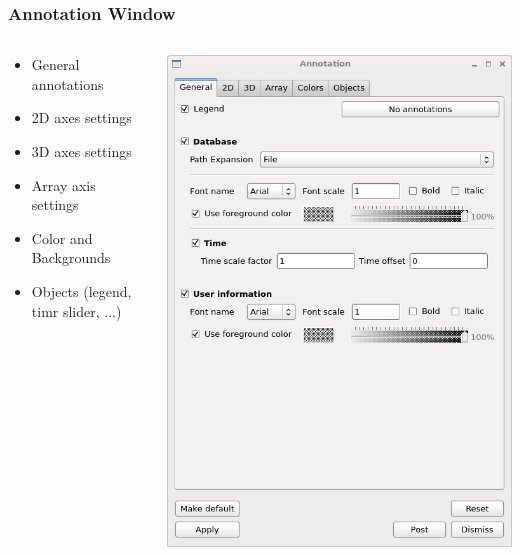 \begin{frame}
\frametitle{Annotation Window}
\begin{columns}
\begin{column}{5cm}
\begin{itemize}
        \item General annotations
        \item 2D axes settings
        \item 3D axes settings
        \item Array axis settings
	\item Color and Backgrounds
	\item Objects (legend, timr slider, ...)
\end{itemize}
\end{column}
\begin{column}{5cm}
        \includegraphics[width=\columnwidth]{figs/visit-guis/visit_annot}
\end{column}
\end{columns}
\end{frame}


